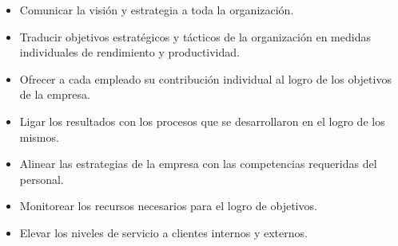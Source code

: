 	\begin{itemize}
   	 \item Comunicar la visión y estrategia a toda la organización.
	\item Traducir objetivos estratégicos y tácticos de la organización en medidas individuales de rendimiento y productividad.
	\item Ofrecer a cada empleado su contribución individual al logro de los objetivos de la empresa.
	\item Ligar los resultados con los procesos que se desarrollaron en el logro de los mismos.
	\item Alinear las estrategias de la empresa con las competencias requeridas del personal.
	\item Monitorear los recursos necesarios para el logro de objetivos.
	\item Elevar los niveles de servicio a clientes internos y externos.

   
  	  \end{itemize}


























